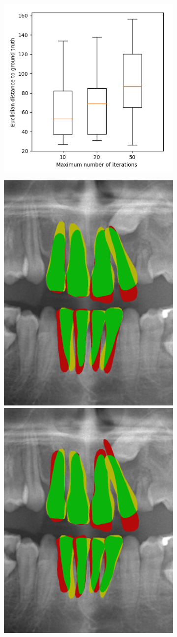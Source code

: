 \documentclass[a4paper,titlepage,12pt]{article}
\begin{document}
\begin{figure}
	\centering
	\begin{subfigure}{0.4\linewidth}
		\centering
		\includegraphics[width=\columnwidth]{results/chart_euclit}
		\caption{}
	\end{subfigure}
	\begin{subfigure}{0.57\linewidth}
		\centering
		\includegraphics[width=0.45\columnwidth]{results/7i10}
		\includegraphics[width=0.45\columnwidth]{results/7i50}

\end{subfigure}
\end{figure}
\end{document}
